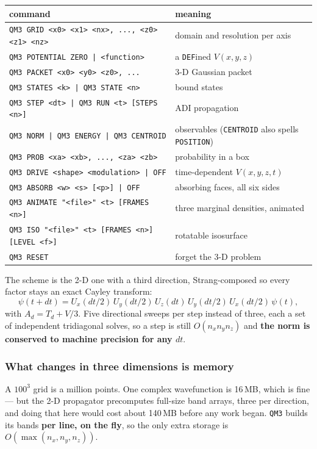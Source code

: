 \documentclass[11pt]{article}
\newcommand{\kw}[1]{\texttt{\uppercase{#1}}}
\newcommand{\code}[1]{\texttt{#1}}
\begin{document}
\begin{center}
\begin{tabular}{lp{6.6cm}}
\textbf{command} & \textbf{meaning}\\
\hline
\code{QM3 GRID <x0> <x1> <nx>, ..., <z0> <z1> <nz>} & domain and resolution per axis\\
\code{QM3 POTENTIAL ZERO | <function>} & a \kw{def}ined $V(x,y,z)$\\
\code{QM3 PACKET <x0> <y0> <z0>, ...} & 3-D Gaussian packet\\
\code{QM3 STATES <k> | QM3 STATE <n>} & bound states\\
\code{QM3 STEP <dt> | QM3 RUN <t> [STEPS <n>]} & ADI propagation\\
\code{QM3 NORM | QM3 ENERGY | QM3 CENTROID} & observables (\code{CENTROID} also spells \code{POSITION})\\
\code{QM3 PROB <xa> <xb>, ..., <za> <zb>} & probability in a box\\
\code{QM3 DRIVE <shape> <modulation> | OFF} & time-dependent $V(x,y,z,t)$\\
\code{QM3 ABSORB <w> <s> [<p>] | OFF} & absorbing faces, all six sides\\
\code{QM3 ANIMATE "<file>" <t> [FRAMES <n>]} & three marginal densities, animated\\
\code{QM3 ISO "<file>" <t> [FRAMES <n>] [LEVEL <f>]} & rotatable isosurface\\
\code{QM3 RESET} & forget the 3-D problem\\
\end{tabular}
\end{center}

The scheme is the 2-D one with a third direction, Strang-composed so
every factor stays an exact Cayley transform:
\[
  \psi(t+dt) = U_x(dt/2)\,U_y(dt/2)\,U_z(dt)\,U_y(dt/2)\,U_x(dt/2)\,\psi(t),
\]
with $A_d = T_d + V/3$. Five directional sweeps per step instead of
three, each a set of independent tridiagonal solves, so a step is still
$O(n_x n_y n_z)$ and \textbf{the norm is conserved to machine precision
for any $dt$}.

\subsubsection*{What changes in three dimensions is memory}

A $100^3$ grid is a million points. One complex wavefunction is 16\,MB,
which is fine --- but the 2-D propagator precomputes full-size band
arrays, three per direction, and doing that here would cost about
140\,MB before any work began. \kw{qm3} builds its bands \textbf{per
line, on the fly}, so the only extra storage is
$O(\max(n_x,n_y,n_z))$.
\end{document}
